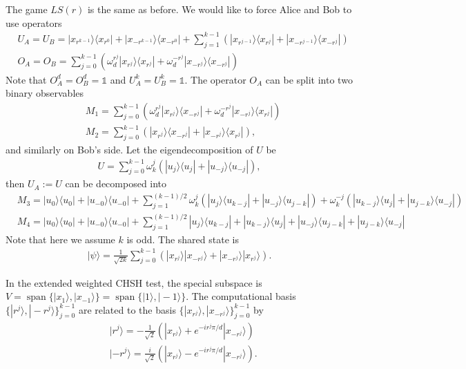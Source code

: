 \documentclass[11pt,letterpaper]{article}
\newcommand{\ket}[1]{|#1\rangle}
\newcommand{\ketbra}[2]{|#1\rangle\langle#2|}
\DeclareMathOperator{\spn}{span}
\newcommand{\1}{\mathbb{1}}
\newcommand{\LS}{LS}
\theoremstyle{definition}
\begin{document}
The game $\LS(r)$ is the same as before.
We would like to force Alice and Bob to use operators
\begin{align*}
    &U_A = U_B = \ketbra{x_{r^{k-1}}}{x_{r^0}}
    + \ketbra{x_{-r^{k-1}}}{x_{-r^0}}+
    \sum_{j=1}^{k-1} \left(\ketbra{x_{r^{j-1}}}{x_{r^j}} + \ketbra{x_{-r^{j-1}}}{x_{-r^j}}\right)\\
    &O_A = O_B = \sum_{j=0}^{k-1} \left(\omega_d^{r^j}\ketbra{x_{r^j}}{x_{r^j}} + \omega_d^{-r^j} \ketbra{x_{-r^j}}{x_{-r^j}}\right)
\end{align*}
Note that $O_A^d = O_B^d = \1$ and $U_A^k = U_B^k = \1$.
The operator $O_A$ can be split into two binary observables
\begin{align*}
    &M_1 = \sum_{j=0}^{k-1} \left( \omega_d^{r^j}\ketbra{x_{r^j}}{x_{-r^j}} +\omega_d^{-r^j} \ketbra{x_{-r^j}}{x_{r^j}}\right) \\
    &M_2 = \sum_{j=0}^{k-1} \left( \ketbra{x_{r^j}}{x_{-r^j}} + \ketbra{x_{-r^j}}{x_{r^j}}\right),
\end{align*}
and similarly on Bob's side.
Let the eigendecomposition of $U$ be 
\begin{align*}
    U = \sum_{j=0}^{k-1} \omega_k^j \left(\ketbra{u_j}{u_j}
    + \ketbra{u_{-j}}{u_{-j}}\right),
\end{align*}
then $U_A := U$ can be decomposed into
\begin{align*}
    &M_3 = \ketbra{u_0}{u_0} + 
    \ketbra{u_{-0}}{u_{-0}} +
    \sum_{j=1}^{(k-1)/2} \omega_k^j\left(\ketbra{u_j}{u_{k-j}} +  \ketbra{u_{-j}}{u_{j-k}}\right)
    +\omega_k^{-j}\left(\ketbra{u_{k-j}}{u_{j}} + \ketbra{u_{j-k}}{u_{-j}}\right) \\
    &M_4 = \ketbra{u_0}{u_0} + 
    \ketbra{u_{-0}}{u_{-0}} +
    \sum_{j=1}^{(k-1)/2} \ketbra{u_j}{u_{k-j}} +  
    \ketbra{u_{k-j}}{u_{j}} + 
    \ketbra{u_{-j}}{u_{j-k}} +  
    \ketbra{u_{j-k}}{u_{-j}}
\end{align*}
Note that here we assume $k$ is odd.
The shared state is
\begin{align*}
    \ket{\psi} = \frac{1}{\sqrt{2k}} \sum_{j=0}^{k-1}
    \left(\ket{x_{r^j}}\ket{x_{-r^j}} + \ket{x_{-r^j}}\ket{x_{r^j}}\right).
\end{align*}

In the extended weighted CHSH test, the special subspace is
$V = \spn\{ \ket{x_1}, \ket{x_{-1}}\} =
\spn\{\ket{1}, \ket{-1}\}$.
The computational basis $\{ \ket{r^j}, \ket{-r^j} \}_{j=0}^{k-1}$ are related to the basis
$
\{ \ket{x_{r^j}}, \ket{x_{-r^j}} \}_{j=0}^{k-1}
$
by
\begin{align*}
    &\ket{r^j} = -\frac{1}{\sqrt{2}}(\ket{x_{r^j}} + e^{-ir^j\pi/d}\ket{x_{-r^j}}) \\
    &\ket{-r^j} = \frac{i}{\sqrt{2}}(\ket{x_{r^j}} - e^{-ir^j\pi/d}\ket{x_{-r^j}}).
\end{align*}
\end{document}
